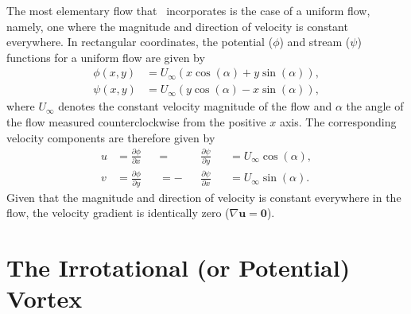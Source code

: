 \documentclass[10pt, twoside]{book}
\begin{document}
			The most elementary flow that \MATfluids\ incorporates is the case of a uniform flow, namely, one where the magnitude and direction of velocity is constant everywhere. In rectangular coordinates, the potential ($\phi$) and stream ($\psi$) functions for a uniform flow are given by
			\begin{subequations}
				\label{eq:UniformFlowDef}
				\begin{align}
					\phi\left(x,y\right) &= U_{\infty}\left(x\cos\left(\alpha\right) + y\sin\left(\alpha\right)\right),\label{eq:UniformFlowDefPhi}\\
					\psi\left(x,y\right) &= U_{\infty}\left(y\cos\left(\alpha\right) - x\sin\left(\alpha\right)\right),\label{eq:UniformFlowDefPsi}
				\end{align}
			\end{subequations}
			where $U_{\infty}$ denotes the constant velocity magnitude of the flow and $\alpha$ the angle of the flow measured counterclockwise from the positive $x$ axis. The corresponding velocity components are therefore given by
			\begin{subequations}
				\label{eq:UniformFlowVel}
				\begin{alignat}{4}
					u &= \frac{\partial\phi}{\partial x} &&=  &&\frac{\partial\psi}{\partial y} &&= U_{\infty}\cos\left(\alpha\right),\label{eq:UniformFlowVelU}\\
					v &= \frac{\partial\phi}{\partial y} &&= -&&\frac{\partial\psi}{\partial x} &&= U_{\infty}\sin\left(\alpha\right).\label{eq:UniformFlowVelV}
				\end{alignat}
			\end{subequations}
			Given that the magnitude and direction of velocity is constant everywhere in the flow, the velocity gradient is identically zero ($\nabla\mathbf{u} = \mathbf{0}$).
			
			
			
		\section{\label{sec:IrrotVortex}The Irrotational (or Potential) Vortex}
			
\end{document}
